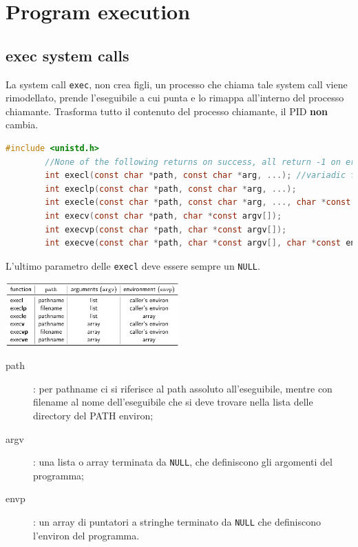\documentclass[a4paper, 12pt]{book}
\begin{document}
    \section{Program execution}

    \subsection{exec system calls}

    La system call \verb|exec|, non crea figli, un processo che chiama 
    tale system call viene rimodellato, prende l'eseguibile a cui punta 
    e lo rimappa all'interno del processo chiamante. Trasforma tutto il contenuto del
    processo chiamante, il PID \textbf{non} cambia.
    \begin{lstlisting}[language=C]
        #include <unistd.h>
        //None of the following returns on success, all return -1 on error 
        int execl(const char *path, const char *arg, ...); //variadic functions
        int execlp(const char *path, const char *arg, ...);
        int execle(const char *path, const char *arg, ..., char *const envp[]);
        int execv(const char *path, char *const argv[]);
        int execvp(const char *path, char *const argv[]);
        int execve(const char *path, char *const argv[], char *const envp[]);
    \end{lstlisting}
    L'ultimo parametro delle \verb|execl| deve essere sempre un \verb|NULL|.
    \begin{center}
        \includegraphics[width=0.5\textwidth]{exec.png}
    \end{center}
    \begin{description}
        \item[path]: per pathname ci si riferisce al path assoluto all'eseguibile,
        mentre con filename al nome dell'eseguibile che si deve trovare nella lista 
        delle directory del PATH environ;
        \item[argv]: una lista o array terminata da \verb|NULL|, che definiscono gli argomenti del programma;
        \item[envp]: un array di puntatori a stringhe terminato da \verb|NULL| che definiscono l'environ del programma.  
    \end{description}
\end{document}
